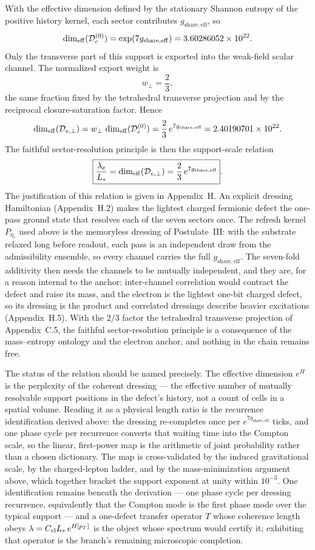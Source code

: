 \documentclass[11pt]{article}
\begin{document}
With the effective dimension defined by the stationary Shannon entropy of the positive history kernel, each sector contributes $g_{\mathrm{share,eff}}$, so
\[
\dim_{\rm eff}(\mathcal D_e^{(0)})
=
\exp(7g_{\mathrm{share,eff}})
=
3.60286052\times10^{22}.
\]
Only the transverse part of this support is exported into the weak-field scalar channel. The normalized export weight is
\[
w_\perp=\frac23,
\]
the same fraction fixed by the tetrahedral transverse projection and by the reciprocal closure-saturation factor. Hence
\[
\dim_{\rm eff}(\mathcal D_{e,\perp})
=
w_\perp\,\dim_{\rm eff}(\mathcal D_e^{(0)})
=
\frac23\,e^{7g_{\mathrm{share,eff}}}
=
2.40190701\times10^{22}.
\]
The faithful sector-resolution principle is then the support-scale relation
\[
\boxed{
\frac{\lambda_e}{L_*}
=
\dim_{\rm eff}(\mathcal D_{e,\perp})
=
\frac23\,e^{7g_{\mathrm{share,eff}}}
}.
\]
The justification of this relation is given in Appendix~H. An explicit dressing Hamiltonian (Appendix~H.2) makes the lightest charged fermionic defect the one-pass ground state that resolves each of the seven sectors once. The refresh kernel $P_{\eta_*}$ used above is the memoryless dressing of Postulate~III: with the substrate relaxed long before readout, each pass is an independent draw from the admissibility ensemble, so every channel carries the full $g_{\mathrm{share,eff}}$. The seven-fold additivity then needs the channels to be mutually independent, and they are, for a reason internal to the anchor: inter-channel correlation would contract the defect and raise its mass, and the electron is the lightest one-bit charged defect, so its dressing is the product and correlated dressings describe heavier excitations (Appendix~H.5). With the $2/3$ factor the tetrahedral transverse projection of Appendix~C.5, the faithful sector-resolution principle is a consequence of the mass--entropy ontology and the electron anchor, and nothing in the chain remains free.

The status of the relation should be named precisely. The effective dimension $e^{H}$ is the perplexity of the coherent dressing --- the effective number of mutually resolvable support positions in the defect's history, not a count of cells in a spatial volume. Reading it as a physical length ratio is the recurrence identification derived above: the dressing re-completes once per $e^{7g_{\mathrm{share,eff}}}$ ticks, and one phase cycle per recurrence converts that waiting time into the Compton scale, so the linear, first-power map is the arithmetic of joint probability rather than a chosen dictionary. The map is cross-validated by the induced gravitational scale, by the charged-lepton ladder, and by the mass-minimization argument above, which together bracket the support exponent at unity within $10^{-3}$. One identification remains beneath the derivation --- one phase cycle per dressing recurrence, equivalently that the Compton mode is the first phase mode over the typical support --- and a one-defect transfer operator $T$ whose coherence length obeys $\lambda=C_{\rm cl}L_*\,e^{H[p_T]}$ is the object whose spectrum would certify it; exhibiting that operator is the branch's remaining microscopic completion.
\end{document}
